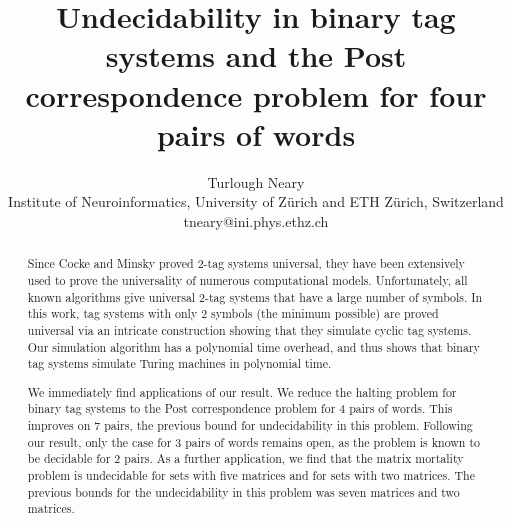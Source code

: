 \documentclass[11pt]{article} \usepackage{amsfonts,amsmath,amssymb,amsthm}
\begin{document}
\title{Undecidability in binary tag systems and the Post correspondence problem for four pairs of words}

\author{Turlough Neary\\
Institute of Neuroinformatics, University of Z\"urich and ETH Z\"urich, Switzerland\\
tneary@ini.phys.ethz.ch
}
\date{}
\maketitle

\begin{abstract}
Since Cocke and Minsky proved 2-tag systems universal, they have been extensively used to prove the universality of numerous computational models. Unfortunately, all known algorithms give universal 2-tag systems that have a large number of symbols. 
In this work, tag systems with only 2 symbols (the minimum possible) are proved universal via an intricate construction showing that they simulate cyclic tag systems. 
Our simulation algorithm has a polynomial time overhead, and thus shows that binary tag systems simulate Turing machines in polynomial time. 

We immediately find applications of our result. 
We reduce the halting problem for binary tag systems to the Post correspondence problem for 4 pairs of words.
This improves on 7 pairs, the previous bound for undecidability in this problem.
Following our result, only the case for 3 pairs of words remains open, as the problem is known to be decidable for 2 pairs. 
As a further application, we find that the matrix mortality problem is undecidable for sets with five  matrices and for sets with two  matrices. 
The previous bounds for the undecidability in this problem was seven  matrices and two  matrices.  
\end{abstract}
\end{document}
